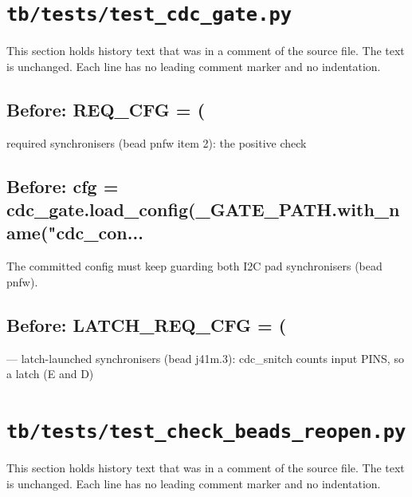 \section{\texttt{tb/tests/test\_cdc\_gate.py}}\label{cr:suite:test-cdc-gate}

This section holds history text that was in a comment of the source file. The text is unchanged. Each line has no leading comment marker and no indentation.

\begin{record}

\subsection*{Before: REQ\_CFG = (}

\begin{textblock}
required synchronisers (bead pnfw item 2): the positive check
\end{textblock}

\subsection*{Before: cfg = cdc\_gate.load\_config(\_GATE\_PATH.with\_name("cdc\_con...}

\begin{textblock}
The committed config must keep guarding both I2C pad synchronisers (bead pnfw).
\end{textblock}

\subsection*{Before: LATCH\_REQ\_CFG = (}

\begin{textblock}
--- latch-launched synchronisers (bead j41m.3): cdc_snitch counts input PINS, so a latch (E and D)
\end{textblock}

\end{record}

\section{\texttt{tb/tests/test\_check\_beads\_reopen.py}}\label{cr:suite:test-check-beads-reopen}

This section holds history text that was in a comment of the source file. The text is unchanged. Each line has no leading comment marker and no indentation.

